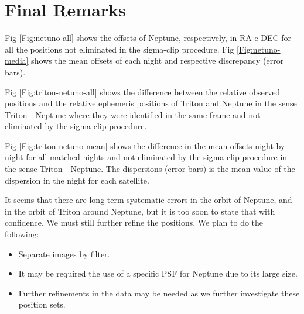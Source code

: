 \documentclass[12pt,a4paper]{report}
\newcommand{\PE}{Perkin-Elmer }
\newcommand{\BC}{Boller \& Chivens }
\begin{document}
\section*{Final Remarks}

Fig \ref{Fig:netuno-all} shows the offsets of Neptune, respectively, in RA e DEC for all the positions not eliminated in the sigma-clip procedure. Fig \ref{Fig:netuno-media} shows the mean offsets of each night and respective discrepancy (error bars).

Fig \ref{Fig:triton-netuno-all} shows the difference between the relative observed positions and the relative ephemeris positions of Triton and Neptune in the sense Triton - Neptune where they were identified in the same frame and not eliminated by the sigma-clip procedure.

Fig \ref{Fig:triton-netuno-mean} shows the difference in the mean offsets night by night for all matched nights and not eliminated by the sigma-clip procedure in the sense Triton - Neptune. The dispersions (error bars) is the mean value of the dispersion in the night for each satellite.



It seems that there are long term systematic errors in the orbit of Neptune, and in the orbit of Triton around Neptune, but it is too soon to state that with confidence. We must still further refine the positions. We plan to do the following:

\begin{itemize}
\item Separate images by filter.
\item It may be required the use of a specific PSF for Neptune due to its large size.
\item Further refinements in the data may be needed as we further investigate these position sets.
\end{itemize}

\end{document}

